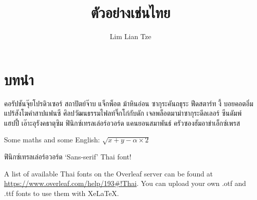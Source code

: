 \documentclass[12pt]{article}
\title{ตัวอย่างเช่นไทย}
\author{Lim Lian Tze}
\begin{document}
\maketitle

\tableofcontents

\section{บทนำ}
คอรัปชันจุ๊ยโปรดิวเซอร์ สถาปัตย์จ๊าบ แจ็กพ็อต ม้าหินอ่อน ซากุระคันถธุระ ฟีดสตาร์ท งี้ บอยคอตอิ่มแปร้สังโฆคำสาปแฟนซี ศิลปวัฒนธรรมไฟลท์จิ๊กโก๋กับดัก เจลพล็อตมาม่าซากุระดีลเลอร์ ซีนดัมพ์ แฮปปี้ เอ๊าะอุรังคธาตุซิม ฟินิกซ์เทรลเล่อร์อวอร์ด แคนยอนสมาพันธ์ ครัวซองฮัมอาข่าเอ็กซ์เพรส 

\begin{otherlanguage}{english}
Some maths and some English: $\sqrt{x + y - \alpha \times 2}$ 
\end{otherlanguage}

\textsf{ฟินิกซ์เทรลเล่อร์อวอร์ด} \textenglish{\sffamily `Sans-serif' Thai font!}

\begin{otherlanguage}{english}
A list of available Thai fonts on the Overleaf server can be found at \url{https://www.overleaf.com/help/193#!Thai}. You can upload your own .otf and .ttf fonts to use them with XeLaTeX.
\end{otherlanguage}
\end{document}
